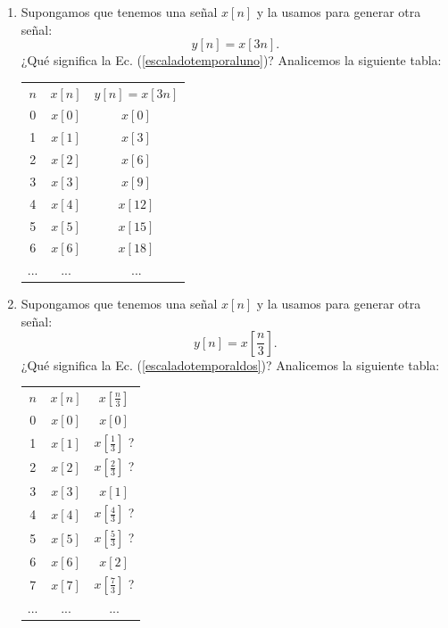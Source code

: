\begin{enumerate}
	\item Supongamos que tenemos una señal $x[n]$ y la usamos para
	generar otra señal:
	\begin{equation}
		y[n] = x[3n].
		\label{escaladotemporaluno}
	\end{equation}
	¿Qué significa la Ec. (\ref{escaladotemporaluno})?
	Analicemos la siguiente tabla:
	
	\begin{center}
		\begin{tabular}{ccc}
			$n$ & $x[n]$ & $y[n] = x[3n]$ \\
			0   &  $x[0]$ & $x[0]$ \\
			1   &  $x[1]$ & $x[3]$ \\
			2   &  $x[2]$ & $x[6]$ \\
			3   &  $x[3]$ & $x[9]$ \\
			4   &  $x[4]$ & $x[12]$ \\
			5   &  $x[5]$ & $x[15]$ \\
			6   &  $x[6]$ & $x[18]$ \\
			... &  ... & ...
		\end{tabular}
	\end{center}
	
	\item Supongamos que tenemos una señal $x[n]$ y la usamos para
	generar otra señal:
	\begin{equation}
		y[n] = x\left[\frac{n}{3}\right].
		\label{escaladotemporaldos}
	\end{equation}
	¿Qué significa la Ec. (\ref{escaladotemporaldos})?
	Analicemos la siguiente tabla:
	
	\begin{center}
		\begin{tabular}{ccc}
			$n$ & $x[n]$  & $x[\frac{n}{3}]$ \\
			0   &  $x[0]$ & $x[0]$ \\
			1   &  $x[1]$ & $x[\frac{1}{3}]$ ?\\
			2   &  $x[2]$ & $x[\frac{2}{3}]$ ?\\
			3   &  $x[3]$ & $x[1]$ \\
			4   &  $x[4]$ & $x[\frac{4}{3}]$ ?\\
			5   &  $x[5]$ & $x[\frac{5}{3}]$ ?\\
			6   &  $x[6]$ & $x[2]$ \\
			7   &  $x[7]$ & $x[\frac{7}{3}]$ ?\\
			... &  ... & ...
		\end{tabular}
	\end{center}
	

\end{enumerate}
